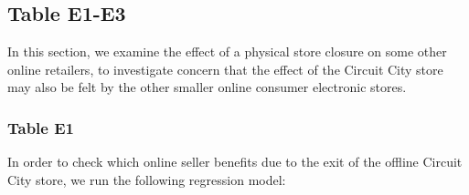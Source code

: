 \documentclass{article}
\begin{document}
\subsection{Table E1-E3}
In this section, we examine the effect of a physical store closure on some other online retailers, to investigate concern that the effect of the Circuit City store may also be felt by the other smaller online consumer electronic stores.
\subsubsection{Table E1}
In order to check which online seller benefits due to the exit of the offline Circuit City store, we run the following regression model:\\
\end{document}
